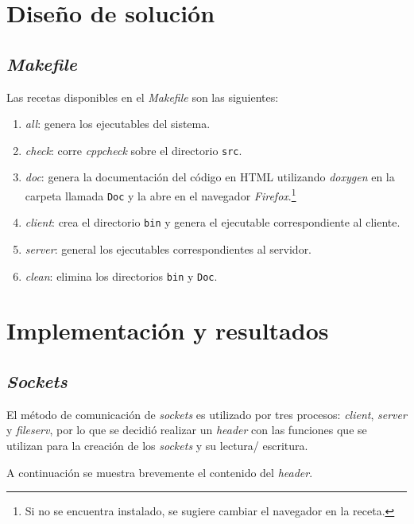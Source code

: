 \documentclass[12pt,a4paper]{article}
\begin{document}
\section{Diseño de solución}
\label{solucion}



\subsection{\emph{Makefile}}
\label{make}
Las recetas disponibles en el \emph{Makefile} son las siguientes:

\begin{enumerate}
  \item \emph{all}: genera los ejecutables del sistema.
  \item \emph{check}: corre \emph{cppcheck} sobre el directorio
  \verb|src|.
  \item \emph{doc}: genera la documentación del código en HTML
  utilizando \emph{doxygen} en la carpeta llamada \verb|Doc| y la
  abre en el navegador  \emph{Firefox}.\footnote{Si no se encuentra
  instalado, se sugiere cambiar el navegador en la receta.}
  \item \emph{client}: crea el directorio \verb|bin| y genera el
  ejecutable correspondiente al cliente.
  \item \emph{server}: general los ejecutables correspondientes al
  servidor.
  \item \emph{clean}: elimina los directorios \verb|bin| y
  \verb|Doc|.
\end{enumerate}


\section{Implementación y resultados}
\label{impres}

\subsection{\emph{Sockets}}
El método de comunicación de \emph{sockets} es utilizado por tres
procesos: \emph{client}, \emph{server} y \emph{fileserv}, por lo
que se decidió realizar un \emph{header} con las funciones que se
utilizan para la creación de los \emph{sockets} y su lectura/
escritura.

\newpage

A continuación se muestra brevemente el contenido del \emph{header}.
\end{document}
